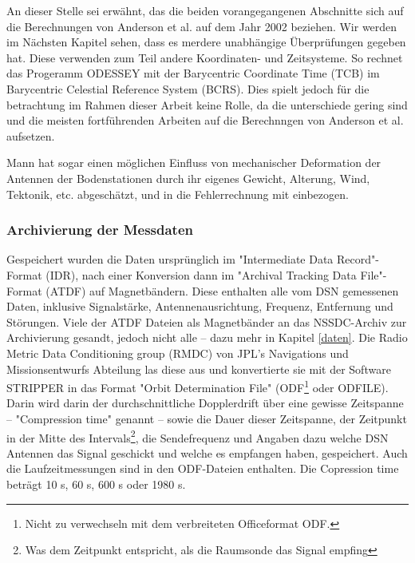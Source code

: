 An dieser Stelle sei erwähnt, das die beiden vorangegangenen Abschnitte sich auf die Berechnungen von Anderson et al. auf dem Jahr 2002 beziehen.
Wir werden im Nächsten Kapitel sehen, dass es merdere unabhängige Überprüfungen gegeben hat.
Diese verwenden zum Teil andere Koordinaten- und Zeitsysteme.
So rechnet das Progeramm ODESSEY mit der Barycentric Coordinate Time (TCB) im Barycentric Celestial Reference System (BCRS).
Dies spielt jedoch für die betrachtung im Rahmen dieser Arbeit keine Rolle, da die unterschiede gering sind und die meisten fortführenden Arbeiten auf die Berechnngen von Anderson et al. aufsetzen.	%

Mann hat sogar einen möglichen Einfluss von mechanischer Deformation der Antennen der Bodenstationen durch ihr eigenes Gewicht,
Alterung, Wind, Tektonik, etc. abgeschätzt, und in die Fehlerrechnung mit einbezogen.\cite{Dittus2006} %


\subsubsection{Archivierung der Messdaten}

Gespeichert wurden die Daten ursprünglich im "Intermediate Data Record"-Format (IDR), nach einer Konversion dann im "Archival Tracking Data File"-Format (ATDF) auf Magnetbändern. Diese enthalten alle vom DSN gemessenen Daten, inklusive Signalstärke, Antennenausrichtung, Frequenz, Entfernung und Störungen.\cite{Turyshev2010} %
Viele der ATDF Dateien als Magnetbänder an das NSSDC-Archiv zur Archivierung gesandt, jedoch nicht alle – dazu mehr in Kapitel \ref{daten}.\cite{Markwardt2002}
Die Radio Metric Data Conditioning group (RMDC) von JPL's Navigations und Missionsentwurfs Abteilung las diese aus und konvertierte sie mit der Software STRIPPER in das Format "Orbit Determination File" (ODF\footnote{Nicht zu verwechseln mit dem verbreiteten Officeformat ODF.} oder ODFILE).
Darin wird darin der durchschnittliche Dopplerdrift über eine gewisse Zeitspanne
– "Compression time" genannt – sowie die Dauer dieser Zeitspanne, der Zeitpunkt in der Mitte des Intervals\footnote{Was dem Zeitpunkt entspricht, als die Raumsonde das Signal empfing\cite{Levy2008}}, die Sendefrequenz und
Angaben dazu welche DSN Antennen das Signal geschickt und welche es empfangen haben, gespeichert.\cite{Levy2008}
Auch die Laufzeitmessungen sind in den ODF-Dateien enthalten.\cite{Anderson2002}
Die Copression time beträgt 10 s, 60 s, 600 s oder 1980 s.\cite{Anderson2002} %


